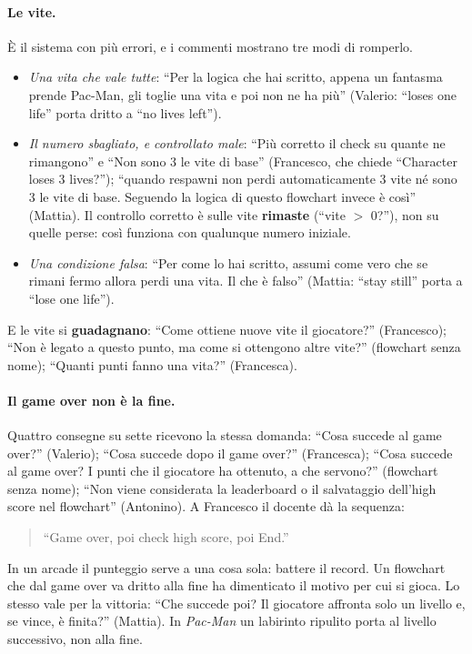 \paragraph{Le vite.} È il sistema con più errori, e i commenti mostrano tre
modi di romperlo.
\begin{itemize}
  \item \emph{Una vita che vale tutte}: ``Per la logica che hai scritto, appena
        un fantasma prende Pac-Man, gli toglie una vita e poi non ne ha più''
        (Valerio: ``loses one life'' porta dritto a ``no lives left'').
  \item \emph{Il numero sbagliato, e controllato male}: ``Più corretto il check
        su quante ne rimangono'' e ``Non sono 3 le vite di base'' (Francesco,
        che chiede ``Character loses 3 lives?''); ``quando respawni non perdi
        automaticamente 3 vite né sono 3 le vite di base. Seguendo la logica di
        questo flowchart invece è così'' (Mattia). Il controllo corretto è sulle
        vite \textbf{rimaste} (``vite $>$ 0?''), non su quelle perse: così
        funziona con qualunque numero iniziale.
  \item \emph{Una condizione falsa}: ``Per come lo hai scritto, assumi come
        vero che se rimani fermo allora perdi una vita. Il che è falso''
        (Mattia: ``stay still'' porta a ``lose one life'').
\end{itemize}
E le vite si \textbf{guadagnano}: ``Come ottiene nuove vite il giocatore?''
(Francesco); ``Non è legato a questo punto, ma come si ottengono altre vite?''
(flowchart senza nome); ``Quanti punti fanno una vita?'' (Francesca).

\paragraph{Il game over non è la fine.} Quattro consegne su sette ricevono la
stessa domanda: ``Cosa succede al game over?'' (Valerio); ``Cosa succede dopo
il game over?'' (Francesca); ``Cosa succede al game over? I punti che il
giocatore ha ottenuto, a che servono?'' (flowchart senza nome); ``Non viene
considerata la leaderboard o il salvataggio dell'high score nel flowchart''
(Antonino). A Francesco il docente dà la sequenza:
\begin{quote}
  ``Game over, poi check high score, poi End.''
\end{quote}
In un arcade il punteggio serve a una cosa sola: battere il record. Un
flowchart che dal game over va dritto alla fine ha dimenticato il motivo per
cui si gioca. Lo stesso vale per la vittoria: ``Che succede poi? Il giocatore
affronta solo un livello e, se vince, è finita?'' (Mattia). In
\emph{Pac-Man} un labirinto ripulito porta al livello successivo, non alla
fine.

